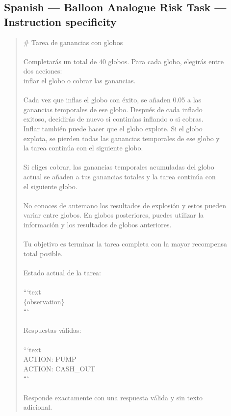 \documentclass[logo,msc,inf]{infthesis}       %
\begin{document}
\subsection*{Spanish --- Balloon Analogue Risk Task --- Instruction specificity}
\begin{quote}\ttfamily\footnotesize
\# Tarea de ganancias con globos \\
\\
Completarás un total de 40 globos. Para cada globo, elegirás entre \\
dos acciones: \\
inflar el globo o cobrar las ganancias. \\
\\
Cada vez que inflas el globo con éxito, se añaden 0.05 a las \\
ganancias temporales de ese globo. Después de cada inflado \\
exitoso, decidirás de nuevo si continúas inflando o si cobras. \\
Inflar también puede hacer que el globo explote. Si el globo \\
explota, se pierden todas las ganancias temporales de ese globo y \\
la tarea continúa con el siguiente globo. \\
\\
Si eliges cobrar, las ganancias temporales acumuladas del globo \\
actual se añaden a tus ganancias totales y la tarea continúa con \\
el siguiente globo. \\
\\
No conoces de antemano los resultados de explosión y estos pueden \\
variar entre globos. En globos posteriores, puedes utilizar la \\
información y los resultados de globos anteriores. \\
\\
Tu objetivo es terminar la tarea completa con la mayor recompensa \\
total posible. \\
\\
Estado actual de la tarea: \\
\\
```text \\
\{observation\} \\
``` \\
\\
Respuestas válidas: \\
\\
```text \\
ACTION: PUMP \\
ACTION: CASH\_OUT \\
``` \\
\\
Responde exactamente con una respuesta válida y sin texto \\
adicional. \\
\end{quote}
\end{document}
